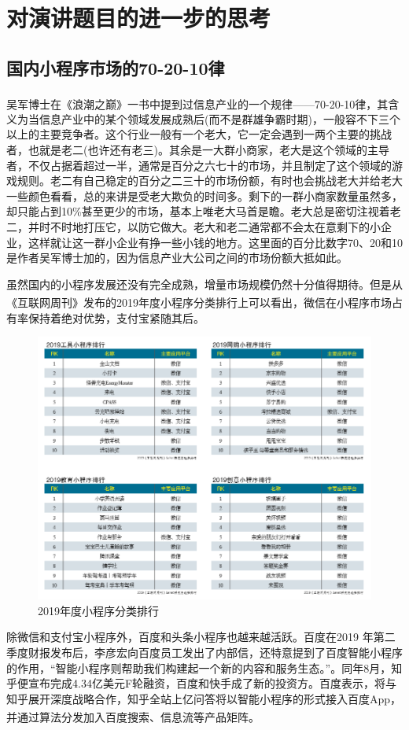 \documentclass{article}
\begin{document}
\section{对演讲题目的进一步的思考}
\subsection{国内小程序市场的70-20-10律}
吴军博士在《浪潮之巅》\textsuperscript{\citep{lczd}}一书中提到过信息产业的一个规律——70-20-10律，其含义为当信息产业中的某个领域发展成熟后(而不是群雄争霸时期)，一般容不下三个以上的主要竞争者。这个行业一般有一个老大，它一定会遇到一两个主要的挑战者，也就是老二(也许还有老三)。其余是一大群小商家，老大是这个领域的主导者，不仅占据着超过一半，通常是百分之六七十的市场，并且制定了这个领域的游戏规则。老二有自己稳定的百分之二三十的市场份额，有时也会挑战老大并给老大一些颜色看看，总的来讲是受老大欺负的时间多。剩下的一群小商家数量虽然多，却只能占到10\%甚至更少的市场，基本上唯老大马首是瞻。老大总是密切注视着老二，并时不时地打压它，以防它做大。老大和老二通常都不会太在意剩下的小企业，这样就让这一群小企业有挣一些小钱的地方。这里面的百分比数字70、20和10是作者吴军博士加的，因为信息产业大公司之间的市场份额大抵如此。\par
虽然国内的小程序发展还没有完全成熟，增量市场规模仍然十分值得期待。但是从《互联网周刊》发布的2019年度小程序分类排行\textsuperscript{\citep{xcxfenlei}}上可以看出，微信在小程序市场占有率保持着绝对优势，支付宝紧随其后。
\begin{figure}[H]
	\centering
	\includegraphics[width=0.7\linewidth]{chart1}
	\caption{2019年度小程序分类排行}
	\label{fig:chart1}
\end{figure}
除微信和支付宝小程序外，百度和头条小程序也越来越活跃。百度在2019 年第二季度财报发布后，李彦宏向百度员工发出了内部信，还特意提到了百度智能小程序的作用，“智能小程序则帮助我们构建起一个新的内容和服务生态。”。同年8月，知乎便宣布完成4.34亿美元F轮融资，百度和快手成了新的投资方。百度表示，将与知乎展开深度战略合作，知乎全站上亿问答将以智能小程序的形式接入百度App，并通过算法分发加入百度搜索、信息流等产品矩阵。\textsuperscript{\citep{caibao}}\par
\end{document}
